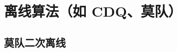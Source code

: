 \section{离线算法（如 CDQ、莫队）}
				\subsection{莫队二次离线}
					\inputminted{cpp}{src/DataStructure/莫队二次离线.cpp}
